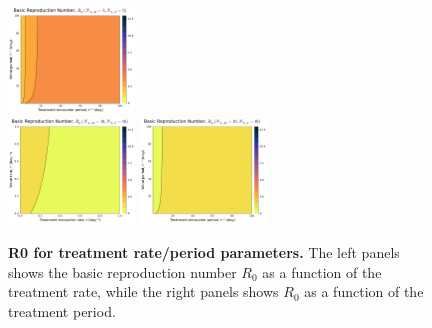 \documentclass[12pt]{article}
\begin{document}
\begin{figure}[H]
    \includegraphics[width=0.3\textwidth]{../../fig/gen_model/R0_periods_txh_5x5.pdf}\\
    \includegraphics[width=0.3\textwidth]{../../fig/gen_model/R0_rates_txh_10x10.pdf}
    \includegraphics[width=0.3\textwidth]{../../fig/gen_model/R0_periods_txh_10x10.pdf}
    \caption{\textbf{R0 for treatment rate/period parameters.} The left panels shows the basic reproduction number \(R_0\) as a function of the treatment rate, while the right panels shows \(R_0\) as a function of the treatment period.}
\end{figure}
\end{document}
